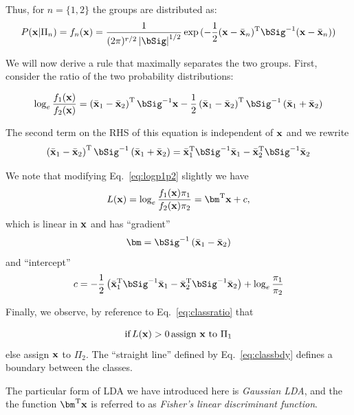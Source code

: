 \documentclass[12pt,a4paper]{tufte-handout}
\begin{document}
Thus, for $n=\{1,2\}$ the groups are distributed as:
\begin{equation}
  P(\bx|\Pi_n)=f_n(\bx) = \frac{1}{(2\pi)^{r/2}\abs{\bSig}^{1/2}}\exp{(-\frac{1}{2}(\bx-\bar\bx_n)^\rT\bSig^{-1}(\bx-\bar\bx_n))}
\end{equation}

We will now derive a rule that maximally separates the two groups. First, consider the ratio of the two probability distributions:

\begin{equation}
  \log_e\frac{f_1(\bx)}{f_2(\bx)} = \left(\bar\bx_1-\bar\bx_2\right)^\rT\bSig^{-1}\bx -\frac{1}{2}\left(\bar\bx_1-\bar\bx_2\right)^\rT\bSig^{-1}\left(\bar\bx_1+\bar\bx_2\right)\label{eq:logp1p2}
\end{equation}

The second term on the RHS of this equation is independent of $\mathbf{x}$ and we rewrite
\begin{equation}
  \left(\bar\bx_1-\bar\bx_2\right)^\rT\bSig^{-1}\left(\bar\bx_1+\bar\bx_2\right)  =\bar\bx_1^\rT\bSig^{-1}\bar\bx_1 - \bar\bx_2^\rT\bSig^{-1}\bar\bx_2
\end{equation}
 
We note that modifying Eq.~\eqref{eq:logp1p2} slightly we have
\begin{equation}
  L(\bx) = \log_e\frac{f_1(\bx)\pi_1}{f_2(\bx)\pi_2} = \bm^\rT\bx+c,\label{eq:lindisc}
\end{equation}
which is linear in $\mathbf{x}$ and has ``gradient''
\begin{equation}
  \bm=\bSig^{-1} \left(\bar\bx_1-\bar\bx_2\right)\label{eq:classbdy}
\end{equation}
and ``intercept''
\begin{equation}
  c = -\frac{1}{2}\left(\bar\bx_1^\rT\bSig^{-1}\bar\bx_1 - \bar\bx_2^\rT\bSig^{-1}\bar\bx_2\right)+\log_e\frac{\pi_1}{\pi_2}
\end{equation}

Finally, we  observe, by reference to Eq.~\eqref{eq:classratio} that

\begin{equation}
  \mbox{if}\,L(\mathbf{x})>0\,\mbox{assign $\mathbf{x}$ to $\Pi_1$}
\end{equation}
else assign $\mathbf{x}$ to $\Pi_2$. The ``straight line'' defined by Eq.~\eqref{eq:classbdy} defines a boundary between the classes.

The particular form of LDA we have introduced here is \textit{Gaussian LDA}, and the  the function $\bm^\rT\bx$ is referred to as \textit{Fisher's linear discriminant function}.
\end{document}
